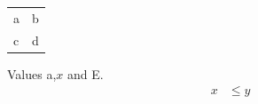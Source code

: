 \documentclass{article}
\begin{document}
\begin{tabular}{ll}
a\!\! & b \\
{c\;} & d \\
\end{tabular}

Values a,\;$x$ and \;E.
\begin{align}
  \!\!x &\leq y
\end{align}
\end{document}
